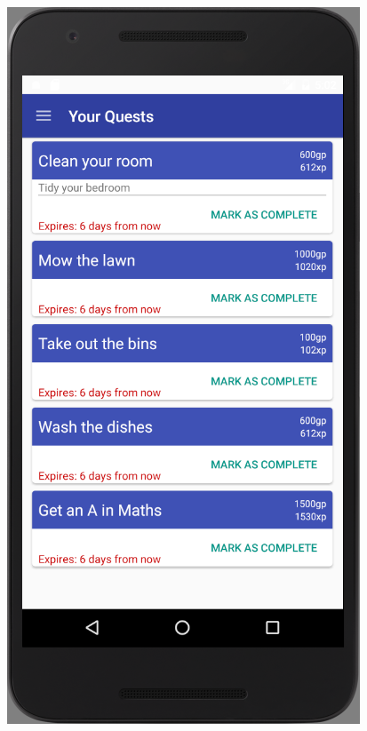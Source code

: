 \begin{figure}[ht] 
  \begin{minipage}[b]{0.25\linewidth}
    \centering
    \includegraphics[width=.8\linewidth, frame]{../images/Screenshot/YourQuestsScreen.png} 
    \vspace{2ex}
  \end{minipage}%
  \begin{minipage}[b]{0.25\linewidth}
    \centering

\end{minipage}
\end{figure}
